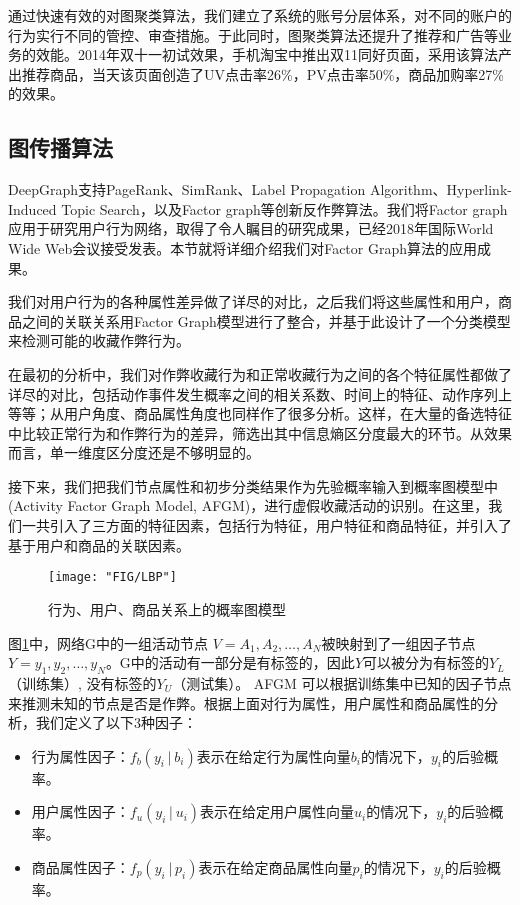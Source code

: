 通过快速有效的对图聚类算法，我们建立了系统的账号分层体系，对不同的账户的行为实行不同的管控、审查措施。于此同时，图聚类算法还提升了推荐和广告等业务的效能。2014年双十一初试效果，手机淘宝中推出双11同好页面，采用该算法产出推荐商品，当天该页面创造了UV点击率26\%，PV点击率50\%，商品加购率27\%的效果。


\subsection{图传播算法}

DeepGraph支持PageRank、SimRank、Label Propagation Algorithm、Hyperlink-Induced Topic Search，以及Factor graph等创新反作弊算法。我们将Factor graph应用于研究用户行为网络，取得了令人瞩目的研究成果\cite{crowds}，已经2018年国际World Wide Web会议接受发表。本节就将详细介绍我们对Factor Graph算法的应用成果。

我们对用户行为的各种属性差异做了详尽的对比，之后我们将这些属性和用户，商品之间的关联关系用Factor Graph模型进行了整合，并基于此设计了一个分类模型来检测可能的收藏作弊行为。

在最初的分析中，我们对作弊收藏行为和正常收藏行为之间的各个特征属性都做了详尽的对比，包括动作事件发生概率之间的相关系数、时间上的特征、动作序列上等等；从用户角度、商品属性角度也同样作了很多分析。这样，在大量的备选特征中比较正常行为和作弊行为的差异，筛选出其中信息熵区分度最大的环节。从效果而言，单一维度区分度还是不够明显的。

接下来，我们把我们节点属性和初步分类结果作为先验概率输入到概率图模型中 (Activity Factor Graph Model, AFGM)，进行虚假收藏活动的识别。在这里，我们一共引入了三方面的特征因素，包括行为特征，用户特征和商品特征，并引入了基于用户和商品的关联因素。

\begin{figure}[h]
	\centering
	\texttt{[image: "FIG/LBP"]}
	\caption{行为、用户、商品关系上的概率图模型}
	\label{fig:LBP}
\end{figure}

图\ref{fig:LBP}中，网络G中的一组活动节点 $V={A_1,A_2,…,A_N}$被映射到了一组因子节点$Y={y_1,y_2,\dots,y_N}$。G中的活动有一部分是有标签的，因此$Y$可以被分为有标签的$Y_L$
（训练集）, 没有标签的$Y_U$（测试集）。 AFGM 可以根据训练集中已知的因子节点来推测未知的节点是否是作弊。根据上面对行为属性，用户属性和商品属性的分析，我们定义了以下3种因子：

\begin{itemize}
\item 行为属性因子：$f_b (y_i│b_i)$表示在给定行为属性向量$b_i$的情况下，$y_i$的后验概率。
\item 用户属性因子：$f_u (y_i│u_i)$表示在给定用户属性向量$u_i$的情况下，$y_i$的后验概率。
\item 商品属性因子：$f_p (y_i│p_i)$表示在给定商品属性向量$p_i$的情况下，$y_i$的后验概率。
\end{itemize}

